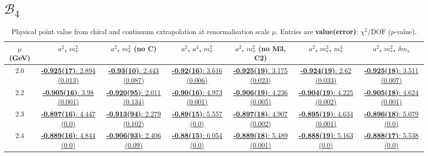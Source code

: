\documentclass[12pt]{extarticle}
\begin{document}
\section{$\mathcal{B}_4$}
\begin{table}[h!]
\begin{center}
\begin{tabular}{|c|c|c|c|c|c|c|}
\hline
$\mu$ (GeV) & $a^2$, $m_\pi^2$& $a^2$, $m_\pi^2$ (no C)& $a^2$, $a^4$, $m_\pi^2$& $a^2$, $m_\pi^2$ (no M3, C2)& $a^2$, $m_\pi^2$, $m_\pi^4$& $a^2$, $m_\pi^2$, $\delta m_s$\\
\hline
2.0& \hyperlink{SSpPP/NPR/a2m2_20.pdf.1}{\textbf{-0.925(17)}: 2.894 (0.013)} & \hyperlink{SSpPP/NPR/a2m2noC_20.pdf.1}{\textbf{-0.93(10)}: 2.443 (0.087)} & \hyperlink{SSpPP/NPR/a2a4m2_20.pdf.1}{\textbf{-0.92(16)}: 3.616 (0.006)} & \hyperlink{SSpPP/NPR/a2m2mcut_20.pdf.1}{\textbf{-0.925(19)}: 3.175 (0.023)} & \hyperlink{SSpPP/NPR/a2m2m4_20.pdf.1}{\textbf{-0.924(19)}: 2.62 (0.033)} & \hyperlink{SSpPP/NPR/a2m2delm_20.pdf.1}{\textbf{-0.925(18)}: 3.511 (0.007)}\\
2.2& \hyperlink{SSpPP/NPR/a2m2_22.pdf.1}{\textbf{-0.905(16)}: 3.98 (0.001)} & \hyperlink{SSpPP/NPR/a2m2noC_22.pdf.1}{\textbf{-0.920(95)}: 2.011 (0.134)} & \hyperlink{SSpPP/NPR/a2a4m2_22.pdf.1}{\textbf{-0.90(16)}: 4.973 (0.001)} & \hyperlink{SSpPP/NPR/a2m2mcut_22.pdf.1}{\textbf{-0.906(19)}: 4.236 (0.005)} & \hyperlink{SSpPP/NPR/a2m2m4_22.pdf.1}{\textbf{-0.904(19)}: 4.225 (0.002)} & \hyperlink{SSpPP/NPR/a2m2delm_22.pdf.1}{\textbf{-0.905(18)}: 4.624 (0.001)}\\
2.3& \hyperlink{SSpPP/NPR/a2m2_23.pdf.1}{\textbf{-0.897(16)}: 4.447 (0.0)} & \hyperlink{SSpPP/NPR/a2m2noC_23.pdf.1}{\textbf{-0.913(94)}: 2.279 (0.102)} & \hyperlink{SSpPP/NPR/a2a4m2_23.pdf.1}{\textbf{-0.89(15)}: 5.557 (0.0)} & \hyperlink{SSpPP/NPR/a2m2mcut_23.pdf.1}{\textbf{-0.897(18)}: 4.907 (0.002)} & \hyperlink{SSpPP/NPR/a2m2m4_23.pdf.1}{\textbf{-0.895(19)}: 4.634 (0.001)} & \hyperlink{SSpPP/NPR/a2m2delm_23.pdf.1}{\textbf{-0.896(18)}: 5.079 (0.0)}\\
2.4& \hyperlink{SSpPP/NPR/a2m2_24.pdf.1}{\textbf{-0.889(16)}: 4.844 (0.0)} & \hyperlink{SSpPP/NPR/a2m2noC_24.pdf.1}{\textbf{-0.906(93)}: 2.406 (0.09)} & \hyperlink{SSpPP/NPR/a2a4m2_24.pdf.1}{\textbf{-0.88(15)}: 6.054 (0.0)} & \hyperlink{SSpPP/NPR/a2m2mcut_24.pdf.1}{\textbf{-0.889(18)}: 5.489 (0.001)} & \hyperlink{SSpPP/NPR/a2m2m4_24.pdf.1}{\textbf{-0.888(19)}: 5.163 (0.0)} & \hyperlink{SSpPP/NPR/a2m2delm_24.pdf.1}{\textbf{-0.888(17)}: 5.538 (0.0)}\\
\hline
\end{tabular}
\caption{Physical point value from chiral and continuum extrapolation at renormalisation scale $\mu$. Entries are \textbf{value(error)}: $\chi^2/\text{DOF}$ ($p$-value).}
\end{center}
\end{table}
\end{document}
